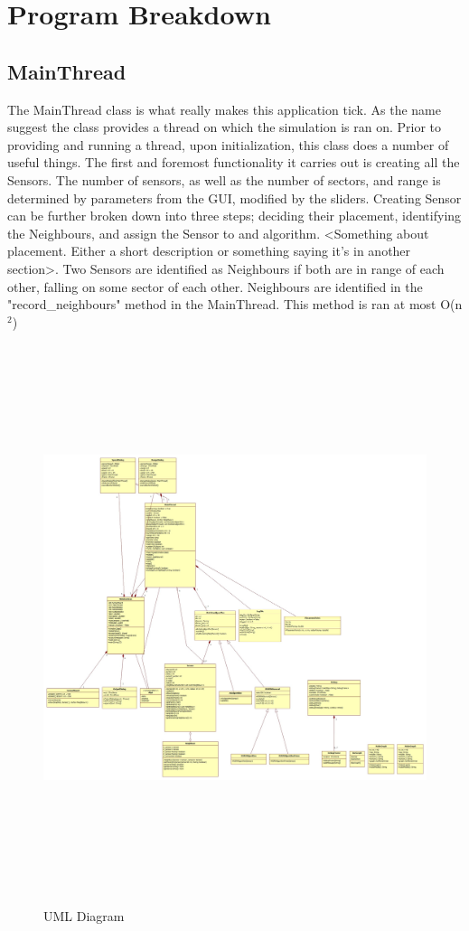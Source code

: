 \section{Program Breakdown}

\subsection{MainThread}

The MainThread class is what really makes this application tick. As the name
suggest the class provides a thread on which the simulation is ran on. Prior to providing and running a thread, upon initialization, this class does a number of useful things. The first and foremost functionality it carries out is creating all
the Sensors. The number of sensors, as well as the number of sectors, and range is determined by parameters from the GUI, modified by the sliders. Creating Sensor
can be further broken down into three steps; deciding their placement, identifying the Neighbours, and assign the Sensor to and algorithm. <Something about
placement. Either a short description or something saying it's in another
section>.  Two Sensors are identified as Neighbours if both are in range of each other, falling on some sector of each other. Neighbours are identified in the
"record\_neighbours" method in the MainThread. This method is ran at most 
O(n$^{2}$)

\begin{figure}
\caption{UML Diagram}
\includegraphics[height = 16cm]{pics/Main.jpg}\\[0.5cm]    
\end{figure}

